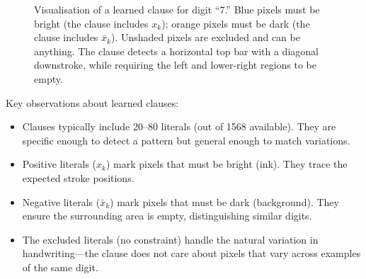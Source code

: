 \begin{figure}[htbp]
\centering
{}
\caption{Visualisation of a learned clause for digit ``7.'' Blue pixels
  must be bright (the clause includes $x_k$); orange pixels must be
  dark (the clause includes $\bar{x}_k$). Unshaded pixels are excluded
  and can be anything. The clause detects a horizontal top bar with a
  diagonal downstroke, while requiring the left and lower-right regions
  to be empty.}
\label{fig:clause-vis}
\end{figure}

Key observations about learned clauses:
\begin{itemize}
  \item Clauses typically include 20--80 literals (out of 1568
    available). They are specific enough to detect a pattern but
    general enough to match variations.
  \item Positive literals ($x_k$) mark pixels that must be bright
    (ink). They trace the expected stroke positions.
  \item Negative literals ($\bar{x}_k$) mark pixels that must be
    dark (background). They ensure the surrounding area is empty,
    distinguishing similar digits.
  \item The excluded literals (no constraint) handle the natural
    variation in handwriting---the clause does not care about pixels
    that vary across examples of the same digit.
\end{itemize}

